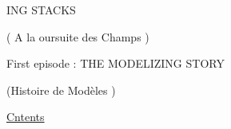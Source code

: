 ING STACKS\par

( A la oursuite des Champs )\par

First episode : THE MODELIZING STORY\par
(Histoire de Modèles )\par

\uline{Cntents} \hand{,}\par

